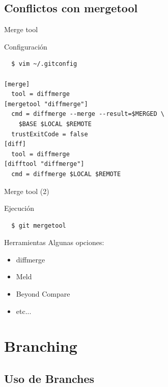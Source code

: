 \documentclass{beamer}
\begin{document}
\subsection{Conflictos con mergetool}

\begin{frame}[fragile]{Merge tool}

  \begin{block}{Configuración}
      \begin{verbatim}
  $ vim ~/.gitconfig
	
[merge]
  tool = diffmerge
[mergetool "diffmerge"]
  cmd = diffmerge --merge --result=$MERGED \ 
    $BASE $LOCAL $REMOTE
  trustExitCode = false
[diff]
  tool = diffmerge
[difftool "diffmerge"]
  cmd = diffmerge $LOCAL $REMOTE
      \end{verbatim}
  \end{block}

\end{frame}

\begin{frame}[fragile]{Merge tool (2)}

  \begin{block}{Ejecución}
      \begin{verbatim}
  $ git mergetool
      \end{verbatim}
  \end{block} \pause

  \begin{block}{Herramientas}
    Algunas opciones:
      \begin{itemize}
       \item diffmerge \pause
       \item Meld \pause
       \item Beyond Compare \pause
       \item etc...
      \end{itemize}

  \end{block}
  
\end{frame}

\section{Branching}

\subsection{Uso de Branches}
\end{document}
